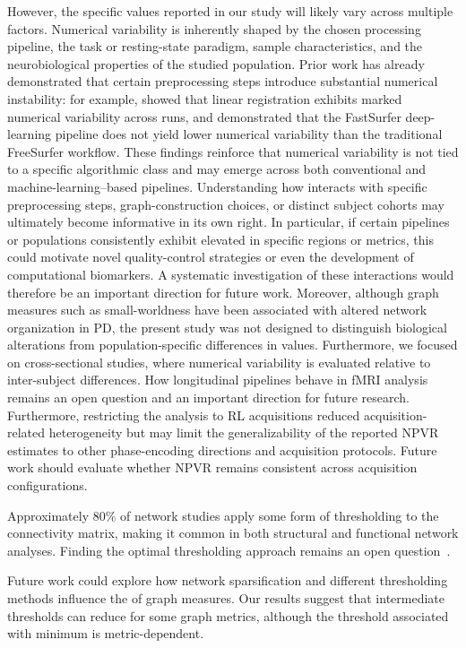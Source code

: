 However, the specific \npvratio{} values reported in our study will likely vary across multiple factors. Numerical variability is inherently shaped by the chosen processing pipeline, the task or resting-state paradigm, sample characteristics, and the neurobiological properties of the studied population. Prior work has already demonstrated that certain preprocessing steps introduce substantial numerical instability: for example, \cite{mirhakimi2025numerical} showed that linear registration exhibits marked numerical variability across runs, and \cite{Gonzalez2025CNN} demonstrated that the FastSurfer deep-learning pipeline does not yield lower numerical variability than the traditional FreeSurfer workflow. These findings reinforce that numerical variability is not tied to a specific algorithmic class and may emerge across both conventional and machine-learning–based pipelines. 
Understanding how \npvratio{} interacts with specific preprocessing steps, graph-construction choices, or distinct subject cohorts may ultimately become informative in its own right. In particular, if certain pipelines or populations consistently exhibit elevated \npvratio{} in specific regions or metrics, this could motivate novel quality-control strategies or even the development of computational biomarkers. A systematic investigation of these interactions would therefore be an important direction for future work. 
Moreover, although graph measures such as small-worldness have been associated with altered network organization in PD, the present study was not designed to distinguish biological alterations from population-specific differences in \npvratio{} values.
Furthermore, we focused on cross-sectional studies, where numerical variability is evaluated relative to inter-subject differences. How longitudinal pipelines behave in fMRI analysis remains an open question and an important direction for future research. Furthermore, restricting the analysis to RL acquisitions reduced acquisition-related heterogeneity but may limit the generalizability of the reported NPVR estimates to other phase-encoding directions and acquisition protocols. Future work should evaluate whether NPVR remains consistent across acquisition configurations.

Approximately 80\% of network studies apply some form of thresholding to the connectivity matrix, making it common in both structural and functional network analyses. Finding the optimal thresholding approach remains an open question~\cite{Helwegen2023Statisticalpower}.

 Future work could explore how network sparsification and different thresholding methods influence the \npvratio{} of graph measures. Our results suggest that intermediate thresholds can reduce \npvratio{} for some graph metrics, although the threshold associated with minimum \npvratio{} is metric-dependent.

